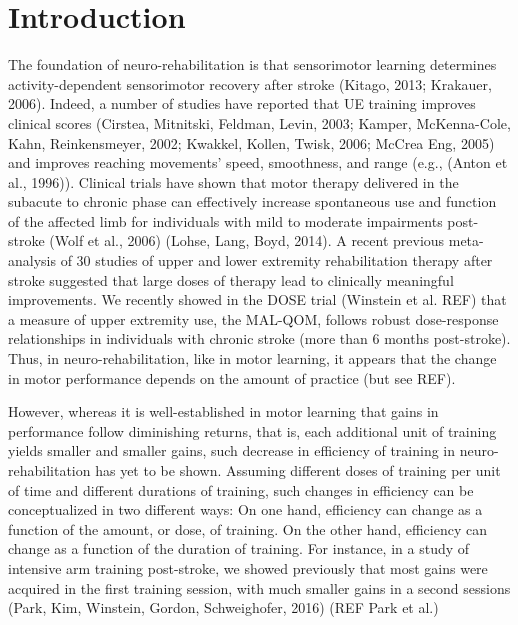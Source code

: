 \section{Introduction}
The foundation of neuro-rehabilitation is that sensorimotor learning determines activity-dependent sensorimotor recovery after stroke (Kitago, 2013; Krakauer, 2006). 
Indeed, a number of studies have reported that UE training improves clinical scores (Cirstea, Mitnitski, Feldman,  Levin, 2003; Kamper, McKenna-Cole, Kahn,  Reinkensmeyer, 2002; Kwakkel, Kollen,  Twisk, 2006; McCrea  Eng, 2005) and improves reaching movements’ speed, smoothness, and range (e.g., (Anton et al., 1996)). 
Clinical trials have shown that motor therapy delivered in the subacute to chronic phase can effectively increase spontaneous use and function of the affected limb for individuals with mild to moderate impairments post-stroke (Wolf et al., 2006) (Lohse, Lang,  Boyd, 2014). 
A recent previous meta-analysis of 30 studies of upper and lower extremity rehabilitation therapy after stroke suggested that large doses of therapy lead to clinically meaningful improvements. 
We recently showed in the DOSE trial (Winstein et al. REF) that a measure of upper extremity use, the MAL-QOM, follows robust dose-response relationships in individuals with chronic stroke (more than 6 months post-stroke). 
Thus, in neuro-rehabilitation, like in motor learning, it appears that the change in motor performance depends on the amount of practice (but see REF). 

However, whereas it is well-established in motor learning that gains in performance follow diminishing returns, that is, each additional unit of training yields smaller and smaller gains, such decrease in efficiency of training in neuro-rehabilitation has yet to be shown. 
Assuming different doses of training per unit of time and different durations of training, such changes in efficiency can be conceptualized in two different ways: On one hand, efficiency can change as a function of the amount, or dose, of training. 
On the other hand, efficiency can change as a function of the duration of training. 
For instance, in a study of intensive arm training post-stroke, we showed previously that most gains were acquired in the first training session, with much smaller gains in a second sessions (Park, Kim, Winstein, Gordon,  Schweighofer, 2016) (REF Park et al.)

